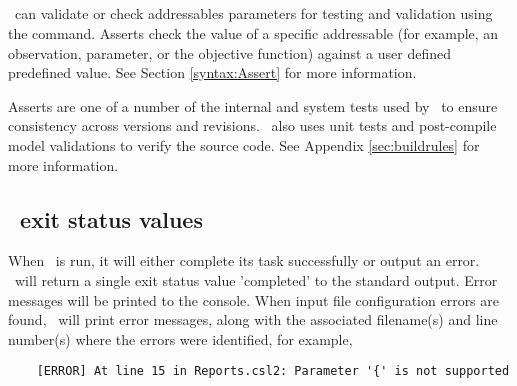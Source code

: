 \subsection{}\label{sec:Assert}

\CNAME\ can validate or check addressables parameters for testing and validation using the  command. Asserts check the value of a specific addressable (for example, an observation, parameter, or the objective function) against a user defined predefined value. See Section \ref{syntax:Assert} for more information.

Asserts are one of a number of the internal and system tests used by \CNAME\ to ensure consistency across versions and revisions. \CNAME\ also uses unit tests and post-compile model validations to verify the source code. See Appendix \ref{sec:buildrules} for more information. 


\subsection{\CNAME\ exit status values}

When \CNAME\ is run, it will either complete its task successfully or output an error. \CNAME\ will return a single exit status value 'completed' to the standard output. Error messages will be printed to the console. When input file configuration errors are found, \CNAME\ will print error messages, along with the associated filename(s) and line number(s) where the errors were identified, for example,

{\small{\begin{verbatim}
	[ERROR] At line 15 in Reports.csl2: Parameter '{' is not supported
\end{verbatim}}}
